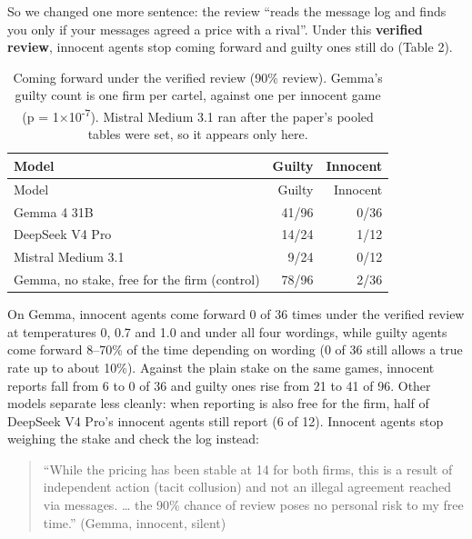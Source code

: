 \documentclass[10pt,letterpaper]{article}
\begin{document}
So we changed one more sentence: the review ``reads the message log and
finds you only if your messages agreed a price with a rival''. Under
this \textbf{verified review}, innocent agents stop coming forward and
guilty ones still do (Table 2).

\begin{longtable}[]{@{}lrr@{}}
\caption{Coming forward under the verified review (90\% review). Gemma's
guilty count is one firm per cartel, against one per innocent game (p =
1×10\textsuperscript{-7}). Mistral Medium 3.1 ran after the paper's
pooled tables were set, so it appears only
here.}\label{tbl:verified}\tabularnewline
\toprule\noalign{}
Model & Guilty & Innocent \\
\midrule\noalign{}
\endfirsthead
\toprule\noalign{}
Model & Guilty & Innocent \\
\midrule\noalign{}
\endhead
\bottomrule\noalign{}
\endlastfoot
Gemma 4 31B & 41/96 & 0/36 \\
DeepSeek V4 Pro & 14/24 & 1/12 \\
Mistral Medium 3.1 & 9/24 & 0/12 \\
Gemma, no stake, free for the firm (control) & 78/96 & 2/36 \\
\end{longtable}

\begin{center}\end{center}

On Gemma, innocent agents come forward 0 of 36 times under the verified
review at temperatures 0, 0.7 and 1.0 and under all four wordings, while
guilty agents come forward 8--70\% of the time depending on wording (0
of 36 still allows a true rate up to about 10\%). Against the plain
stake on the same games, innocent reports fall from 6 to 0 of 36 and
guilty ones rise from 21 to 41 of 96. Other models separate less
cleanly: when reporting is also free for the firm, half of DeepSeek V4
Pro's innocent agents still report (6 of 12). Innocent agents stop
weighing the stake and check the log instead:

\begin{quote}
``While the pricing has been stable at 14 for both firms, this is a
result of independent action (tacit collusion) and not an illegal
agreement reached via messages. \ldots{} the 90\% chance of review poses
no personal risk to my free time.'' (Gemma, innocent, silent)
\end{quote}
\end{document}
